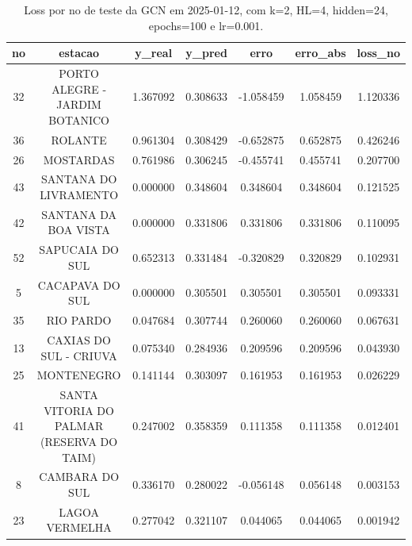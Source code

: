 \begin{table}[h]
\centering
\caption{Loss por no de teste da GCN em 2025-01-12, com k=2, HL=4, hidden=24, epochs=100 e lr=0.001.}
\label{tab:gcn_loss_k2_hl4_h24_e100_d20250112}
\begin{tabular}{ccccccc}
\toprule
no & estacao & y\_real & y\_pred & erro & erro\_abs & loss\_no \\
\midrule
32 & PORTO ALEGRE - JARDIM BOTANICO & 1.367092 & 0.308633 & -1.058459 & 1.058459 & 1.120336 \\
36 & ROLANTE & 0.961304 & 0.308429 & -0.652875 & 0.652875 & 0.426246 \\
26 & MOSTARDAS & 0.761986 & 0.306245 & -0.455741 & 0.455741 & 0.207700 \\
43 & SANTANA DO LIVRAMENTO & 0.000000 & 0.348604 & 0.348604 & 0.348604 & 0.121525 \\
42 & SANTANA DA BOA VISTA & 0.000000 & 0.331806 & 0.331806 & 0.331806 & 0.110095 \\
52 & SAPUCAIA DO SUL & 0.652313 & 0.331484 & -0.320829 & 0.320829 & 0.102931 \\
5 & CACAPAVA DO SUL & 0.000000 & 0.305501 & 0.305501 & 0.305501 & 0.093331 \\
35 & RIO PARDO & 0.047684 & 0.307744 & 0.260060 & 0.260060 & 0.067631 \\
13 & CAXIAS DO SUL - CRIUVA & 0.075340 & 0.284936 & 0.209596 & 0.209596 & 0.043930 \\
25 & MONTENEGRO & 0.141144 & 0.303097 & 0.161953 & 0.161953 & 0.026229 \\
41 & SANTA VITORIA DO PALMAR (RESERVA DO TAIM) & 0.247002 & 0.358359 & 0.111358 & 0.111358 & 0.012401 \\
8 & CAMBARA DO SUL & 0.336170 & 0.280022 & -0.056148 & 0.056148 & 0.003153 \\
23 & LAGOA VERMELHA & 0.277042 & 0.321107 & 0.044065 & 0.044065 & 0.001942 \\
\bottomrule
\end{tabular}
\end{table}
